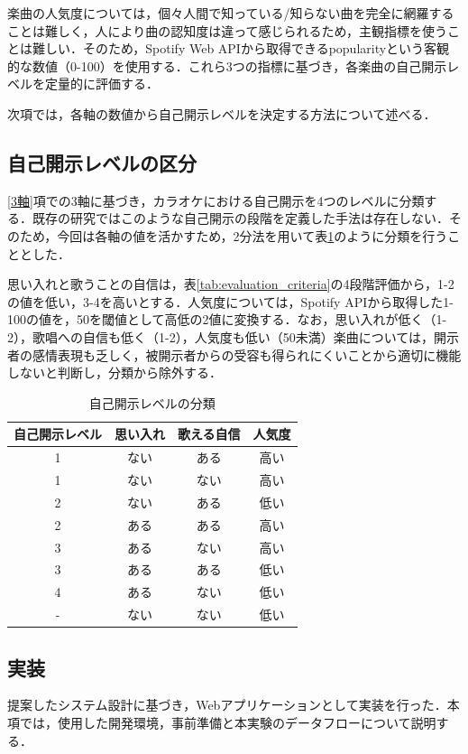 楽曲の人気度については，個々人間で知っている/知らない曲を完全に網羅することは難しく，人により曲の認知度は違って感じられるため，主観指標を使うことは難しい．そのため，Spotify Web API\cite{SpotifyWebAPI}から取得できるpopularityという客観的な数値（0-100）を使用する．これら3つの指標に基づき，各楽曲の自己開示レベルを定量的に評価する．

次項では，各軸の数値から自己開示レベルを決定する方法について述べる．


\subsection{自己開示レベルの区分}

\ref{3軸}項での3軸に基づき，カラオケにおける自己開示を4つのレベルに分類する．既存の研究ではこのような自己開示の段階を定義した手法は存在しない．そのため，今回は各軸の値を活かすため，2分法を用いて表\ref{tab:自己開示レベルの分類}のように分類を行うこととした．

思い入れと歌うことの自信は，表\ref{tab:evaluation_criteria}の4段階評価から，1-2の値を低い，3-4を高いとする．人気度については，Spotify APIから取得した1-100の値を，50を閾値として高低の2値に変換する．なお，思い入れが低く（1-2），歌唱への自信も低く（1-2），人気度も低い（50未満）楽曲については，開示者の感情表現も乏しく，被開示者からの受容も得られにくいことから適切に機能しないと判断し，分類から除外する．

\begin{table}[H]
\centering
\caption{自己開示レベルの分類}
\begin{tabular}{|c|c|c|c|}
\hline
自己開示レベル & 思い入れ & 歌える自信 &  人気度  \\
\hline
1 & ない & ある & 高い \\
\hline
1 & ない & ない & 高い \\
\hline
2 & ない & ある & 低い \\
\hline
2 & ある & ある & 高い \\
\hline
3 & ある & ない & 高い \\
\hline
3 & ある & ある & 低い \\
\hline
4 & ある & ない & 低い \\
\hline
- & ない & ない & 低い \\
\hline
\end{tabular}
\label{tab:自己開示レベルの分類}
\end{table}


\subsection{実装}
提案したシステム設計に基づき，Webアプリケーションとして実装を行った．本項では，使用した開発環境，事前準備と本実験のデータフローについて説明する．

